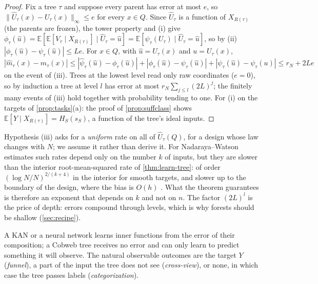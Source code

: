 \documentclass[11pt]{article}
\theoremstyle{definition}
\theoremstyle{remark}
\newcommand{\E}{\mathbb{E}}
\begin{document}
\begin{proof}
Fix a tree $\tau$ and suppose every parent has error at most $e$, so $\|\hat U_\tau(x)-
U_\tau(x)\|_\infty\le e$ for every $x\in Q$.  Since $\hat U_\tau$ is a function of $X_{R(\tau)}$
(the parents are frozen), the tower property and (i) give
$\phi_\tau(\hat u)=\E[\E[V_\tau\mid X_{R(\tau)}]\mid\hat U_\tau=\hat u]=\E[\psi_\tau(U_\tau)\mid\hat
U_\tau=\hat u]$, so by (ii) $|\phi_\tau(\hat u)-\psi_\tau(\hat u)|\le Le$.  For $x\in Q$, with
$\hat u=\hat U_\tau(x)$ and $u=U_\tau(x)$,
\[
  |\hat m_\tau(x)-m_\tau(x)|\le|\hat\psi_\tau(\hat u)-\phi_\tau(\hat u)|
  +|\phi_\tau(\hat u)-\psi_\tau(\hat u)|+|\psi_\tau(\hat u)-\psi_\tau(u)|\le r_N+2Le
\]
on the event of (iii).  Trees at the lowest level read only raw coordinates ($e=0$), so by
induction a tree at level $l$ has error at most $r_N\sum_{j\le l}(2L)^j$; the finitely many
events of (iii) hold together with probability tending to one.  For (i) on the targets of
\cref{prop:tasks}(a): the proof of \cref{prop:suffclass} shows
$\E[Y\mid X_{R(\tau)}]=H_S(s_S)$, a function of the tree's ideal inputs.
\end{proof}

Hypothesis (iii) asks for a \emph{uniform} rate on all of $\hat U_\tau(Q)$, for a design whose
law changes with $N$; we assume it rather than derive it.  For Nadaraya--Watson estimates such
rates depend only on the number $k$ of inputs, but they are slower than the interior
root-mean-squared rate of \cref{thm:learn-tree}: of order $(\log N/N)^{2/(k+4)}$ in the interior
for smooth targets, and slower up to the boundary of the design, where the bias is $O(h)$
\citep{gyorfi2002}.  What the theorem guarantees is therefore an exponent that depends on $k$
and not on $n$.  The factor $(2L)^l$ is the price of depth: errors compound through levels, which
is why forests should be shallow (\cref{sec:recipe}).

A KAN or a neural network learns inner functions from the error of their composition; a
Cobweb tree receives no error and can only learn to predict something it will observe.  The
natural observable outcomes are the target $Y$ (\emph{funnel}), a part of the input the tree
does not see (\emph{cross-view}), or none, in which case the tree passes labels
(\emph{categorization}).
\end{document}
